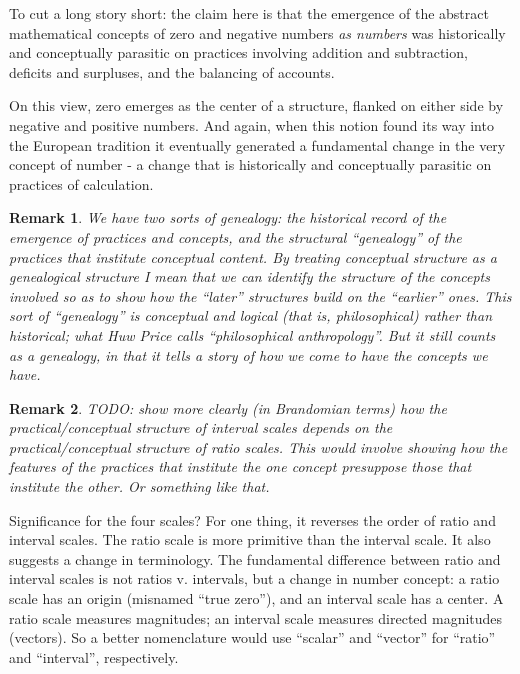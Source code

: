 \documentclass[11pt,twoside]{article}
\newtheorem{remark}{Remark}
\begin{document}
To cut a long story short: the claim here is that the emergence of the
abstract mathematical concepts of zero and negative numbers \textit{as
  numbers} was historically and conceptually parasitic on practices
involving addition and subtraction, deficits and surpluses, and the
balancing of accounts.

On this view, zero emerges as the center of a structure, flanked on
either side by negative and positive numbers.  And again, when this
notion found its way into the European tradition it eventually
generated a fundamental change in the very concept of number - a
change that is historically and conceptually parasitic on practices of
calculation.

\begin{remark}
We have two sorts of genealogy: the historical record of the emergence
of practices and concepts, and the structural ``genealogy'' of the
practices that institute conceptual content.  By treating conceptual
structure as a genealogical structure I mean that we can identify the
structure of the concepts involved so as to show how the ``later''
structures build on the ``earlier'' ones.  This sort of ``genealogy''
is conceptual and logical (that is, philosophical) rather than
historical; what Huw Price calls ``philosophical anthropology''.  But
it still counts as a genealogy, in that it tells a story of how we
come to have the concepts we have.
\end{remark}

\begin{remark}
TODO: show more clearly (in Brandomian terms) how the
practical/conceptual structure of interval scales depends on the
practical/conceptual structure of ratio scales.  This would involve
showing how the features of the practices that institute the one
concept presuppose those that institute the other.  Or something like
that.
\end{remark}

Significance for the four scales?  For one thing, it reverses the
order of ratio and interval scales.  The ratio scale is more primitive
than the interval scale.  It also suggests a change in terminology.
The fundamental difference between ratio and interval scales is not
ratios v. intervals, but a change in number concept: a ratio scale has
an origin (misnamed ``true zero''), and an interval scale has a
center.  A ratio scale measures magnitudes; an interval scale measures
directed magnitudes (vectors).  So a better nomenclature would use
``scalar'' and ``vector'' for ``ratio'' and ``interval'',
respectively.
\end{document}
